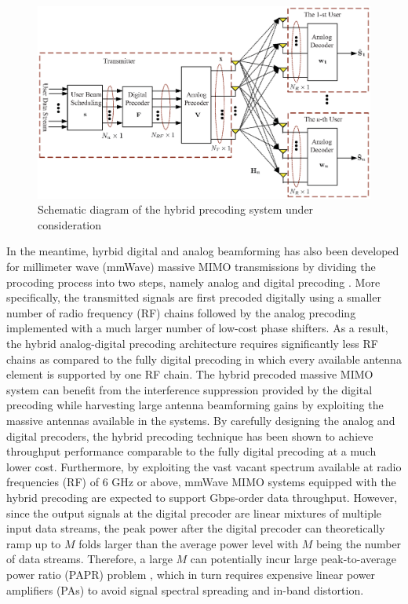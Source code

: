 \documentclass[conference]{IEEEtran}
\begin{document}
\begin{figure}[ht]
    \begin{center}
	\includegraphics[scale=0.65]{Figure/SystemSchematic_new.eps}
	\caption{Schematic diagram of the hybrid precoding system under consideration}\label{fig:BlockDiagram}
    \end{center}
\end{figure}

In the meantime, hyrbid digital and analog beamforming has also been developed for millimeter wave (mmWave) massive MIMO transmissions by dividing the procoding process into two steps, namely analog and digital precoding \cite{han2015large, el2014spatially}. More specifically, the transmitted signals are first precoded digitally using a smaller number of radio frequency (RF) chains followed by the analog precoding implemented with a much larger number of low-cost phase shifters. As a result, the hybrid analog-digital precoding architecture requires significantly less RF chains as compared to the fully digital precoding in which every available antenna element is supported by one RF chain. The hybrid precoded massive MIMO system can benefit from the interference suppression provided by the digital precoding while harvesting large antenna beamforming gains by exploiting the massive antennas available in the systems. By carefully designing the analog and digital precoders, the hybrid precoding technique has been shown to achieve throughput performance comparable to the fully digital precoding at a much lower cost\cite{alkhateeb2014channel}. Furthermore, by exploiting the vast vacant spectrum available at radio frequencies (RF) of $6$ GHz or above, mmWave MIMO systems equipped with the hybrid precoding are expected to support Gbps-order data throughput. However, since the output signals at the digital precoder are linear mixtures of multiple input data streams, the peak power after the digital precoder can theoretically ramp up to $M$ folds larger than the average power level with $M$ being the number of data streams. Therefore, a large $M$ can potentially incur large peak-to-average power ratio (PAPR) problem \cite{mohammed2013per,Chen2017}, which in turn requires expensive linear power amplifiers (PAs) to avoid signal spectral spreading and in-band distortion.
\end{document}
